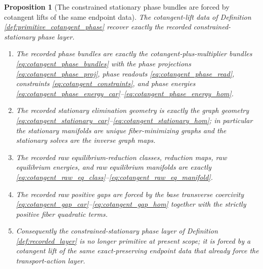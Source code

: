\documentclass[11pt]{article}
\newtheorem{proposition}{Proposition}
\begin{document}
\begin{proposition}[The constrained stationary phase bundles are forced by cotangent lifts of the same endpoint data]
\label{prop:phase_from_cotangent_lift}
The cotangent-lift data of Definition \ref{def:primitive_cotangent_phase} recover exactly the recorded constrained-stationary phase layer.
\begin{enumerate}
    \item The recorded phase bundles are exactly the cotangent-plus-multiplier bundles \eqref{eq:cotangent_phase_bundles} with the phase projections \eqref{eq:cotangent_phase_proj}, phase readouts \eqref{eq:cotangent_phase_read}, constraints \eqref{eq:cotangent_constraints}, and phase energies \eqref{eq:cotangent_phase_energy_car}--\eqref{eq:cotangent_phase_energy_hom}.
    \item The recorded stationary elimination geometry is exactly the graph geometry \eqref{eq:cotangent_stationary_car}--\eqref{eq:cotangent_stationary_hom}; in particular the stationary manifolds are unique fiber-minimizing graphs and the stationary solves are the inverse graph maps.
    \item The recorded raw equilibrium-reduction classes, reduction maps, raw equilibrium energies, and raw equilibrium manifolds are exactly \eqref{eq:cotangent_raw_eq_class}--\eqref{eq:cotangent_raw_eq_manifold}.
    \item The recorded raw positive gaps are forced by the base transverse coercivity \eqref{eq:cotangent_gap_car}--\eqref{eq:cotangent_gap_hom} together with the strictly positive fiber quadratic terms.
    \item Consequently the constrained-stationary phase layer of Definition \ref{def:recorded_layer} is no longer primitive at present scope; it is forced by a cotangent lift of the same exact-preserving endpoint data that already force the transport-action layer.
\end{enumerate}
\end{proposition}
\end{document}
